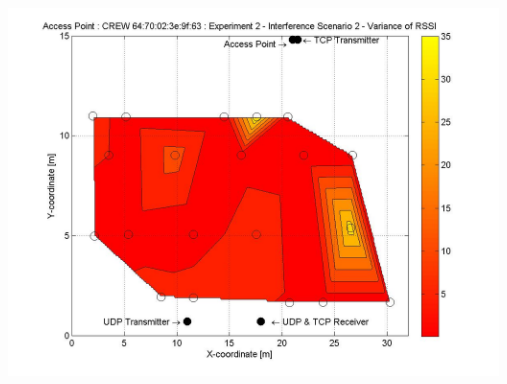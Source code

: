 \documentclass[11pt,a4paper,headinclude,footinclude,chapterprefix=on]{scrreprt}
\begin{document}
\begin{longtable}
	\includegraphics[width=13cm]{../../Source/plot/CREW_63/63_Wifi_Ex_2_Variance.jpg} \\
\end{longtable}
\end{document}
